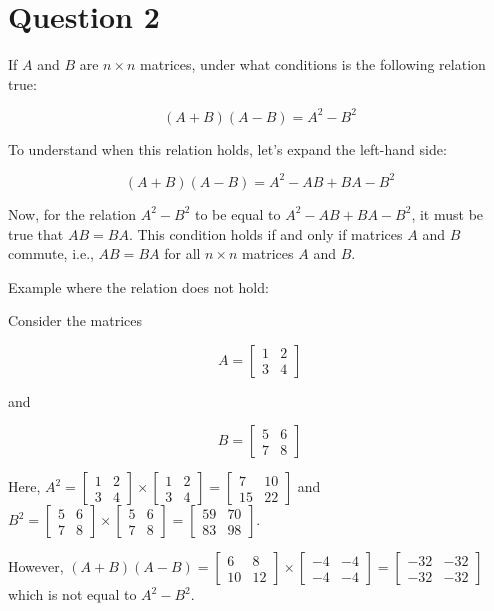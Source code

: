 \section{Question 2}
If \( A \) and \( B \) are \( n \times n \) matrices, under what conditions is the following relation true:

\[
(A + B)(A - B) = A^2 - B^2
\]

To understand when this relation holds, let's expand the left-hand side:

\[
(A + B)(A - B) = A^2 - AB + BA - B^2
\]

Now, for the relation \( A^2 - B^2 \) to be equal to \( A^2 - AB + BA - B^2 \), it must be true that \( AB = BA \). This condition holds if and only if matrices \( A \) and \( B \) commute, i.e., \( AB = BA \) for all \( n \times n \) matrices \( A \) and \( B \).

Example where the relation does not hold:

Consider the matrices

\[
A = \begin{bmatrix}
	1 & 2 \\
	3 & 4
\end{bmatrix}
\]

and

\[
B = \begin{bmatrix}
	5 & 6 \\
	7 & 8
\end{bmatrix}
\]

Here, \( A^2 = \begin{bmatrix} 1 & 2 \\ 3 & 4 \end{bmatrix} \times \begin{bmatrix} 1 & 2 \\ 3 & 4 \end{bmatrix} = \begin{bmatrix} 7 & 10 \\ 15 & 22 \end{bmatrix} \) and \( B^2 = \begin{bmatrix} 5 & 6 \\ 7 & 8 \end{bmatrix} \times \begin{bmatrix} 5 & 6 \\ 7 & 8 \end{bmatrix} = \begin{bmatrix} 59 & 70 \\ 83 & 98 \end{bmatrix} \).

However, \( (A + B)(A - B) = \begin{bmatrix} 6 & 8 \\ 10 & 12 \end{bmatrix} \times \begin{bmatrix} -4 & -4 \\ -4 & -4 \end{bmatrix} = \begin{bmatrix} -32 & -32 \\ -32 & -32 \end{bmatrix} \) which is not equal to \( A^2 - B^2 \).

